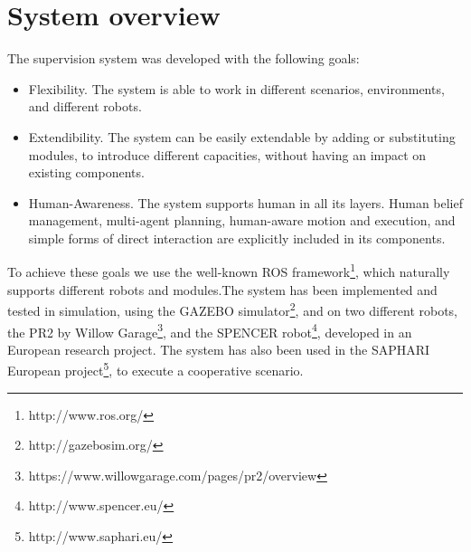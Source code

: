 \section{System overview}
\label{intro-system_overview}
The supervision system was developed with the following goals:
\begin{itemize}
\item Flexibility. The system is able to work in different scenarios, environments, and different robots.
\item Extendibility. The system can be easily extendable by adding or substituting modules, to introduce different capacities, without having an impact on existing components.
\item Human-Awareness. The system supports human in all its layers. Human belief management, multi-agent planning, human-aware motion and execution, and simple forms of direct interaction are explicitly included in its components.
\end{itemize}

To achieve these goals we use the well-known ROS framework\footnote{http://www.ros.org/}, which naturally supports different robots and modules.The system has been implemented and tested in simulation, using the GAZEBO simulator\footnote{http://gazebosim.org/}, and on two different robots, the PR2 by Willow Garage\footnote{https://www.willowgarage.com/pages/pr2/overview}, and the SPENCER robot\footnote{http://www.spencer.eu/}, developed in an European research project. The system has also been used in the SAPHARI European project\footnote{http://www.saphari.eu/}, to execute a cooperative scenario.

